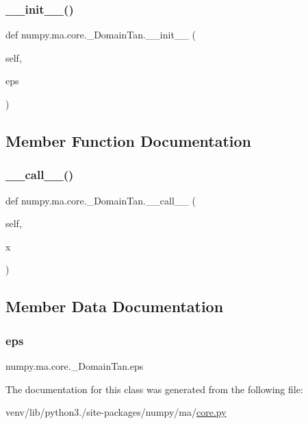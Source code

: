 \subsubsection{\texorpdfstring{\+\_\+\+\_\+init\+\_\+\+\_\+()}{\_\_init\_\_()}}
{\footnotesize\ttfamily def numpy.\+ma.\+core.\+\_\+\+Domain\+Tan.\+\_\+\+\_\+init\+\_\+\+\_\+ (\begin{DoxyParamCaption}\item[{}]{self,  }\item[{}]{eps }\end{DoxyParamCaption})}



\subsection{Member Function Documentation}
\mbox{\label{classnumpy_1_1ma_1_1core_1_1__DomainTan_a29fced6f16fe967467f209bd1fd14a04}} 
\subsubsection{\texorpdfstring{\+\_\+\+\_\+call\+\_\+\+\_\+()}{\_\_call\_\_()}}
{\footnotesize\ttfamily def numpy.\+ma.\+core.\+\_\+\+Domain\+Tan.\+\_\+\+\_\+call\+\_\+\+\_\+ (\begin{DoxyParamCaption}\item[{}]{self,  }\item[{}]{x }\end{DoxyParamCaption})}



\subsection{Member Data Documentation}
\mbox{\label{classnumpy_1_1ma_1_1core_1_1__DomainTan_a5814fdcee90bcb3aa65ec5154acb8234}} 
\subsubsection{\texorpdfstring{eps}{eps}}
{\footnotesize\ttfamily numpy.\+ma.\+core.\+\_\+\+Domain\+Tan.\+eps}



The documentation for this class was generated from the following file\+:\begin{DoxyCompactItemize}
\item 
venv/lib/python3./site-\/packages/numpy/ma/\hyperlink{numpy_2ma_2core_8py}{core.\+py}\end{DoxyCompactItemize}
